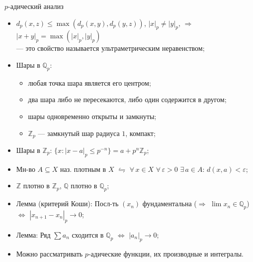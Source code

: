 \documentclass[serif, aspectratio=169]{beamer}
\begin{document}
\begin{frame}{$p$-адический анализ}
    \begin{itemize}
        \item $d_p(x,z)\leqslant\max(d_p(x,y),d_p(y,z))$, $|x|_p\neq|y|_p$, $\Rightarrow$ $|x+y|_p=\max(|x|_p,|y|_p)$\\ --- это свойство называется ультраметрическим неравенством;
        \item Шары в $\mathbb{Q}_p$:
        \begin{itemize}
            \item любая точка шара является его центром;
            \item два шара либо не пересекаются, либо один содержится в другом;
            \item шары одновременно открыты и замкнуты;
            \item $\mathbb{Z}_p$ --- замкнутый шар радиуса $1$, компакт;
        \end{itemize}
        \item Шары в $\mathbb{Z}_p$: $\{x:|x-a|_p\leqslant p^{-n}\}=a+p^n\mathbb{Z}_p$;
        \item Мн-во $A\subseteq X$ наз. плотным в $X$ $\leftrightharpoons$ $\forall\,x\in X$ $\forall\,\varepsilon>0$ $\exists\,a\in A$: $d(x,a)<\varepsilon$;
        \item $\mathbb{Z}$ плотно в $\mathbb{Z}_p$, $\mathbb{Q}$ плотно в $\mathbb{Q}_p$;
        \item Лемма (критерий Коши): Посл-ть $(x_n)$ фундаментальна ($\Rightarrow$ $\lim x_n \in \mathbb{Q}_p$)\\ $\Leftrightarrow$ $|x_{n+1}-x_n|_p\to0$;
        \item Лемма: Ряд $\sum a_n$ сходится в $\mathbb{Q}_p$ $\Leftrightarrow$ $|a_n|_p\to0$;
        \item Можно рассматривать $p$-адические функции, их производные и интегралы.
    \end{itemize}
    
    \note{
        \begin{itemize}
            \item ---
        \end{itemize}
    }
\end{frame}
\end{document}
